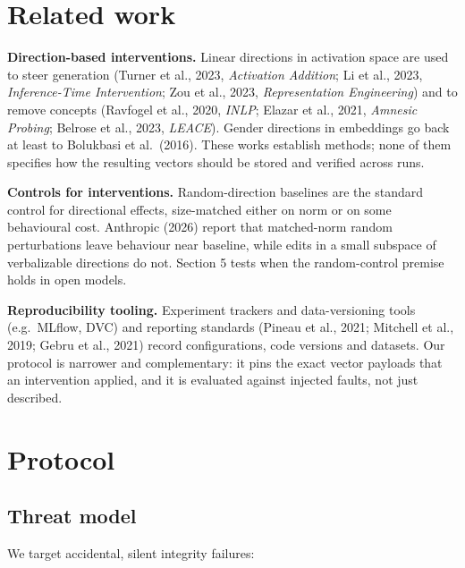 \documentclass[
  10pt,
]{article}
\newcounter{none} %
\begin{document}
\section{Related work}\label{related-work}

\textbf{Direction-based interventions.} Linear directions in activation
space are used to steer generation (Turner et al., 2023,
\emph{Activation Addition}; Li et al., 2023, \emph{Inference-Time
Intervention}; Zou et al., 2023, \emph{Representation Engineering}) and
to remove concepts (Ravfogel et al., 2020, \emph{INLP}; Elazar et al.,
2021, \emph{Amnesic Probing}; Belrose et al., 2023, \emph{LEACE}).
Gender directions in embeddings go back at least to Bolukbasi et
al.~(2016). These works establish methods; none of them specifies how
the resulting vectors should be stored and verified across runs.

\textbf{Controls for interventions.} Random-direction baselines are the
standard control for directional effects, size-matched either on norm or
on some behavioural cost. Anthropic (2026) report that matched-norm
random perturbations leave behaviour near baseline, while edits in a
small subspace of verbalizable directions do not. Section 5 tests when
the random-control premise holds in open models.

\textbf{Reproducibility tooling.} Experiment trackers and
data-versioning tools (e.g.~MLflow, DVC) and reporting standards (Pineau
et al., 2021; Mitchell et al., 2019; Gebru et al., 2021) record
configurations, code versions and datasets. Our protocol is narrower and
complementary: it pins the exact vector payloads that an intervention
applied, and it is evaluated against injected faults, not just
described.

\section{Protocol}\label{protocol}

\subsection{Threat model}\label{threat-model}

We target accidental, silent integrity failures:
\end{document}
